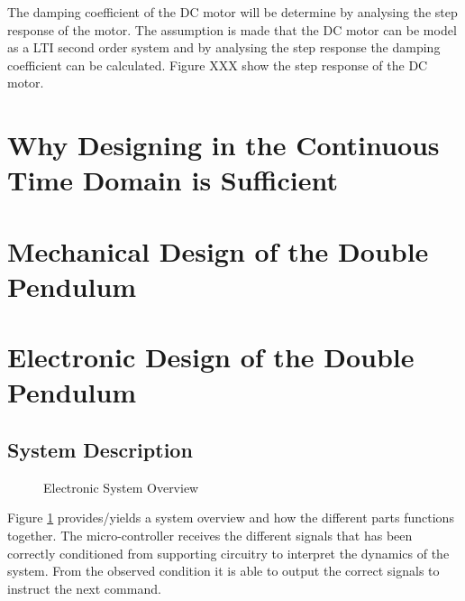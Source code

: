 \documentclass[a4paper,12pt]{article}
\begin{document}
	The damping coefficient of the DC motor will be determine by analysing the step response of the motor. The assumption is made that the DC motor can be model as a LTI second order system and by analysing the step response the damping coefficient can be calculated. Figure XXX show the step response of the DC motor.
	
	\section{Why Designing in the Continuous Time Domain is Sufficient}
	
	\section{Mechanical Design of the Double Pendulum}
	
	
	\newpage
	\section{Electronic Design of the Double Pendulum}
	
	\subsection{System Description}
	
	\begin{figure}[h]
		\centering
		
		\caption{Electronic System Overview}
		\label{fig:electronicSystemOverview}
	\end{figure}
	
	
	Figure \ref{fig:electronicSystemOverview} provides/yields a system overview and how the different parts functions together. The micro-controller receives the different signals that has been correctly conditioned from supporting circuitry to interpret the dynamics of the system. From the observed condition it is able to output the correct signals to instruct the next command.
	
\end{document}
